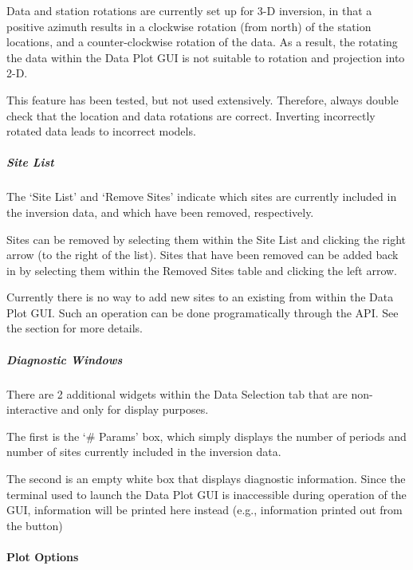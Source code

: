 \documentclass[letterpaper,10pt,english]{sphinxmanual}
\begin{document}
Data and station rotations are currently set up for 3-D inversion, in that a positive azimuth results in a clockwise rotation (from north) of the station locations, and a counter-clockwise rotation of the data. As a result, the rotating the data within the Data Plot GUI is not suitable to rotation and projection into 2-D.

This feature has been tested, but not used extensively. Therefore, always double check that the location and data rotations are correct. Inverting incorrectly rotated data leads to incorrect models.


\subparagraph{Site List}
\label{\detokenize{content/data_plot/main_window:site-list}}
The ‘Site List’ and ‘Remove Sites’ indicate which sites are currently included in the inversion data, and which have been removed, respectively.

Sites can be removed by selecting them within the Site List and clicking the right arrow (to the right of the list). Sites that have been removed can be added back in by selecting them within the Removed Sites table and clicking the left arrow.

Currently there is no way to add new sites to an existing {\hyperref[\detokenize{content/api_core/input_files:data-file}]{}} from within the Data Plot GUI. Such an operation can be done programatically through the API. See the {\hyperref[\detokenize{content/examples/recipes:recipes}]{}} section for more details.


\subparagraph{Diagnostic Windows}
\label{\detokenize{content/data_plot/main_window:diagnostic-windows}}
There are 2 additional widgets within the Data Selection tab that are non-interactive and only for display purposes.

The first is the ‘\# Params’ box, which simply displays the number of periods and number of sites currently included in the inversion data.

The second is an empty white box that displays diagnostic information. Since the terminal used to launch the Data Plot GUI is inaccessible during operation of the GUI, information will be printed here instead (e.g., information printed out from the {\hyperref[\detokenize{content/data_plot/main_window:print-periods}]{}} button)


\paragraph{Plot Options}
\label{\detokenize{content/data_plot/main_window:plot-options}}\label{\detokenize{content/data_plot/main_window:id3}}
\begin{figure}[htbp]
\centering

\noindent{}
\end{figure}
\end{document}
